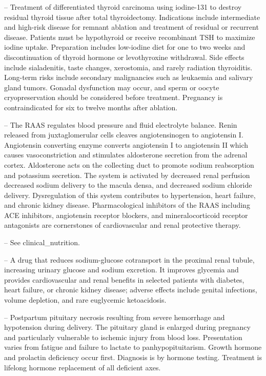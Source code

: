 -- Treatment of differentiated thyroid carcinoma using iodine-131 to destroy residual thyroid tissue after total thyroidectomy. Indications include intermediate and high-risk disease for remnant ablation and treatment of residual or recurrent disease. Patients must be hypothyroid or receive recombinant TSH to maximize iodine uptake. Preparation includes low-iodine diet for one to two weeks and discontinuation of thyroid hormone or levothyroxine withdrawal. Side effects include sialadenitis, taste changes, xerostomia, and rarely radiation thyroiditis. Long-term risks include secondary malignancies such as leukaemia and salivary gland tumors. Gonadal dysfunction may occur, and sperm or oocyte cryopreservation should be considered before treatment. Pregnancy is contraindicated for six to twelve months after ablation.

-- The RAAS regulates blood pressure and fluid electrolyte balance. Renin released from juxtaglomerular cells cleaves angiotensinogen to angiotensin I. Angiotensin converting enzyme converts angiotensin I to angiotensin II which causes vasoconstriction and stimulates aldosterone secretion from the adrenal cortex. Aldosterone acts on the collecting duct to promote sodium reabsorption and potassium secretion. The system is activated by decreased renal perfusion decreased sodium delivery to the macula densa, and decreased sodium chloride delivery. Dysregulation of this system contributes to hypertension, heart failure, and chronic kidney disease. Pharmacological inhibitors of the RAAS including ACE inhibitors, angiotensin receptor blockers, and mineralocorticoid receptor antagonists are cornerstones of cardiovascular and renal protective therapy.

-- See clinical\_nutrition.

-- A drug that reduces sodium-glucose cotransport in the proximal renal tubule, increasing urinary glucose and sodium excretion. It improves glycemia and provides cardiovascular and renal benefits in selected patients with diabetes, heart failure, or chronic kidney disease; adverse effects include genital infections, volume depletion, and rare euglycemic ketoacidosis.

-- Postpartum pituitary necrosis resulting from severe hemorrhage and hypotension during delivery. The pituitary gland is enlarged during pregnancy and particularly vulnerable to ischemic injury from blood loss. Presentation varies from fatigue and failure to lactate to panhypopituitarism. Growth hormone and prolactin deficiency occur first. Diagnosis is by hormone testing. Treatment is lifelong hormone replacement of all deficient axes.

